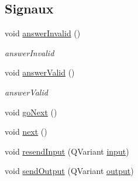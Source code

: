 \subsection*{Signaux}
\begin{DoxyCompactItemize}
\item 
void \hyperlink{classSimpleHotel_1_1SH__QuestionState_a69caaa66c68de820a5afa9584f24ca31}{answer\-Invalid} ()
\begin{DoxyCompactList}\small\item\em answer\-Invalid \end{DoxyCompactList}\item 
void \hyperlink{classSimpleHotel_1_1SH__QuestionState_ad69b23cffd57936805e7b66483c5c951}{answer\-Valid} ()
\begin{DoxyCompactList}\small\item\em answer\-Valid \end{DoxyCompactList}\item 
void \hyperlink{classSimpleHotel_1_1SH__GenericState_a5afea8cc17017b08b8db6d51b5bcefc4}{go\-Next} ()
\item 
void \hyperlink{classSimpleHotel_1_1SH__GenericState_a0ff6668857baab63d4f13c4d7175acbd}{next} ()
\item 
void \hyperlink{classSimpleHotel_1_1SH__InOutState_ab259648430e9e6e0667e79398c68c0d9}{resend\-Input} (Q\-Variant \hyperlink{classSimpleHotel_1_1SH__InOutState_a487d2ca6200fed372b1a27cfa27774db}{input})
\item 
void \hyperlink{classSimpleHotel_1_1SH__InOutState_a6f39ba3a9682ece4a0d2c96e8f8983a0}{send\-Output} (Q\-Variant \hyperlink{classSimpleHotel_1_1SH__InOutState_a71b15e4d49b9c2aa540500065ceb39da}{output})
\end{DoxyCompactItemize}
